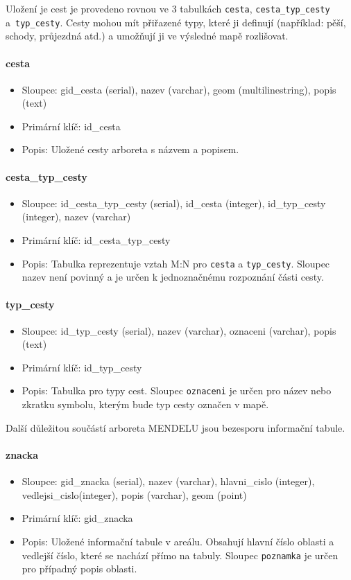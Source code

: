 \documentclass[12pt]{article}%
\begin{document}
{{Uložení je cest je provedeno rovnou ve 3 tabulkách \texttt{cesta}, \texttt{cesta\_typ\_cesty} 
a~\texttt{typ\_cesty}. Cesty mohou mít přiřazené typy, které ji definují (například: pěší, schody, průjezdná atd.)
a umožňují ji ve výsledné mapě rozlišovat.
\paragraph{cesta}
\begin{itemize}
\item Sloupce: gid\_cesta (serial), nazev (varchar), geom (multilinestring), popis (text)
\item Primární klíč: id\_cesta
\item Popis: Uložené cesty arboreta s názvem a popisem.
\end{itemize}

\paragraph{cesta\_typ\_cesty}
\begin{itemize}
\item Sloupce: id\_cesta\_typ\_cesty (serial), id\_cesta (integer), id\_typ\_cesty (integer), 
nazev (varchar)
\item Primární klíč: id\_cesta\_typ\_cesty
\item Popis: Tabulka reprezentuje vztah M:N pro \texttt{cesta} a \texttt{typ\_cesty}. 
Sloupec nazev není povinný a je určen k jednoznačnému rozpoznání části cesty.
\end{itemize}

\paragraph{typ\_cesty}
\begin{itemize}
\item Sloupce: id\_typ\_cesty (serial), nazev (varchar), oznaceni (varchar), popis (text)
\item Primární klíč: id\_typ\_cesty
\item Popis: Tabulka pro typy cest. Sloupec \texttt{oznaceni} je určen pro název nebo zkratku 
symbolu, kterým bude typ cesty označen v mapě.
\end{itemize}

Další důležitou součástí arboreta MENDELU jsou bezesporu informační tabule.
\paragraph{znacka}
\begin{itemize}
\item Sloupce: gid\_znacka (serial), nazev (varchar), hlavni\_cislo (integer), vedlejsi\_cislo(integer), 
popis (varchar), geom (point)
\item Primární klíč: gid\_znacka
\item Popis: Uložené informační tabule v areálu. Obsahují hlavní číslo oblasti a vedlejší číslo, které 
se nachází přímo na tabuly. Sloupec \texttt{poznamka} je určen pro případný popis oblasti.
\end{itemize}

}}
\end{document}
